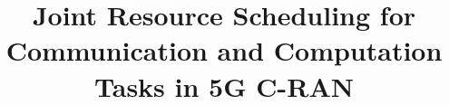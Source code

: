 \documentclass[journal, 12pt, onecolumn, draftclsnofoot]{IEEEtran}
\newcommand{\deny}[1]{}
\begin{document}
	
	\title{
		Joint Resource Scheduling for \deny{Heterogeneous} Communication and Computation Tasks in 5G C-RAN
	}
	\author{
    }%
	\maketitle

	
	
	
	

	
	
\end{document}
